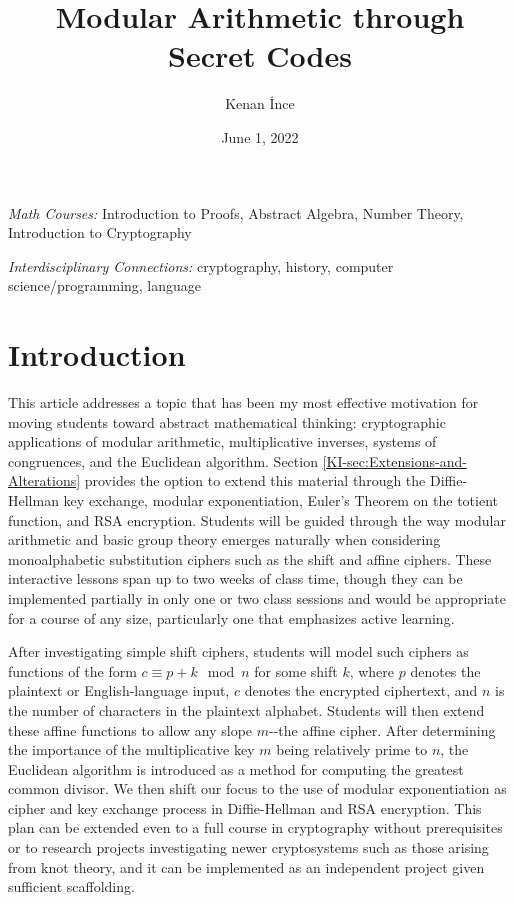 \documentclass[11pt]{article}
\date{June 1, 2022}
\theoremstyle{plain}
\theoremstyle{remark}
\theoremstyle{definition}
\theoremstyle{definition}
\theoremstyle{definition}
\theoremstyle{plain}
\theoremstyle{plain}
\theoremstyle{plain}
\theoremstyle{definition}
\begin{document}
\title{Modular Arithmetic through Secret Codes}

\author{Kenan \.{I}nce}
\maketitle



{\small \textit{\textit{Math Courses:}} Introduction to Proofs, Abstract Algebra, Number Theory, Introduction to Cryptography}

{\small \textit{\textit{Interdisciplinary Connections: }} cryptography, history, computer science/programming, language}

\maketitle

\section{Introduction}

This article addresses a topic that has been my most effective motivation for moving students toward abstract mathematical thinking: cryptographic applications of modular arithmetic,
multiplicative inverses, systems of congruences, and the Euclidean
algorithm. Section \ref{KI-sec:Extensions-and-Alterations} provides
the option to extend this material through the Diffie-Hellman key
exchange, modular exponentiation, Euler's Theorem on the totient function,
and RSA encryption. Students will be guided through the way modular
arithmetic and basic group theory emerges naturally when considering
monoalphabetic substitution ciphers such as the shift and affine ciphers.
These interactive lessons span up to two weeks of class time, though
they can be implemented partially in only one or two class sessions
and would be appropriate for a course of any size, particularly one
that emphasizes active learning.

After investigating simple shift ciphers, students will model such
ciphers as functions of the form $c\equiv p+k\mod n$ for some shift
$k$, where $p$ denotes the plaintext or English-language input,
$c$ denotes the encrypted ciphertext, and $n$ is the number of characters
in the plaintext alphabet. Students will then extend these affine
functions to allow any slope $m$-{}-the affine cipher. After determining
the importance of the multiplicative key $m$ being relatively prime
to $n$, the Euclidean algorithm is introduced as a method for computing
the greatest common divisor. We then shift our focus to the use of modular exponentiation
as cipher and key exchange process in Diffie-Hellman and RSA encryption.
This plan can be extended even to a full course in cryptography without
prerequisites or to research projects investigating newer cryptosystems
such as those arising from knot theory, and it can be implemented
as an independent project given sufficient scaffolding. 
\end{document}
